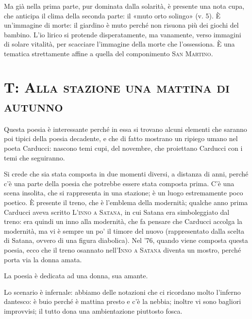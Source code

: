 \documentclass{book}
\begin{document}
Ma già nella prima parte, pur dominata dalla solarità, è presente una nota cupa, che anticipa il clima della seconda parte: il «muto orto solingo» (v. 5). È un'immagine di morte: il giardino è muto perché non risuona più dei giochi del bambino. L'io lirico si protende disperatamente, ma vanamente, verso immagini di solare vitalità, per scacciare l'immagine della morte che l'ossessiona. È una tematica strettamente affine a quella del componimento \textsc{San Martino}.

\section{T: \textsc{Alla stazione una mattina di autunno}}

Questa poesia è interessante perché in essa si trovano alcuni elementi
che saranno poi tipici della poesia decadente, e che di fatto mostrano
un ripiego umano nel poeta Carducci: nascono temi cupi, del novembre,
che proiettano Carducci con i temi che seguiranno.

Si crede che sia stata composta in due momenti diversi, a distanza di
anni, perché c'è una parte della poesia che potrebbe essere stata
composta prima. C'è una scena insolita, che si rappresenta in una
stazione; è un luogo estremamente poco poetico. È presente il treno, che
è l'emblema della modernità; qualche anno prima Carducci aveva scritto
\textsc{L'inno a Satana}, in cui Satana era simboleggiato dal treno: era
quindi un inno alla modernità, che fa pensare che Carducci accolga la
modernità, ma vi è sempre un po' il timore del nuovo (rappresentato
dalla scelta di Satana, ovvero di una figura diabolica). Nel '76, quando
viene composta questa poesia, ecco che il treno osannato nell'\textsc{Inno
a Satana} diventa un mostro, perché porta via la donna amata.

La poesia è dedicata ad una donna, sua amante.

Lo scenario è infernale: abbiamo delle notazioni che ci ricordano molto
l'inferno dantesco: è buio perché è mattina presto e c'è la nebbia;
inoltre vi sono bagliori improvvisi; il tutto dona una ambientazione
piuttosto fosca.
\end{document}
